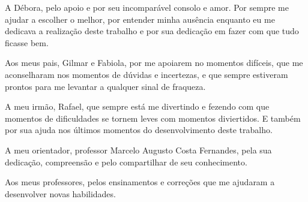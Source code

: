 \begin{agradecimentos}

A Débora, pelo apoio e por seu incomparável consolo e amor. Por sempre me ajudar a escolher o melhor, por entender minha ausência enquanto eu me dedicava a realização deste trabalho e por sua dedicação em fazer com que tudo ficasse bem.

Aos meus pais, Gilmar e Fabiola, por me apoiarem no momentos difíceis, que me aconselharam nos momentos de dúvidas e incertezas, e que sempre estiveram prontos para me levantar a qualquer sinal de  fraqueza.

A meu irmão, Rafael, que sempre está me divertindo e fezendo com que momentos de dificuldades se tornem leves com momentos diviertidos. E também por sua ajuda nos últimos momentos do desenvolvimento deste trabalho.

A meu orientador, professor Marcelo Augusto Costa Fernandes, pela sua dedicação, compreensão e pelo compartilhar de seu conhecimento.

Aos meus professores, pelos ensinamentos e correções que me ajudaram a desenvolver novas habilidades.


\end{agradecimentos}